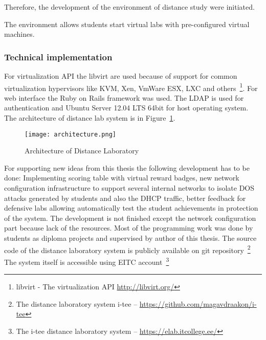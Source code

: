 Therefore, the development of the environment of distance study were initiated.

The environment allows students start virtual labs with pre-configured virtual machines. 
\subsubsection{Technical implementation}
For virtualization \gls{API} the libvirt are used because of support for common virtualization hypervisors like \gls{KVM}, Xen, VmWare ESX, LXC and others~\footnote{libvirt - The virtualization API \url{http://libvirt.org/}}. For web interface the Ruby on Rails framework was used. The \gls{LDAP} is used for authentication and Ubuntu Server 12.04 LTS 64bit for host operating system. The architecture of distance lab system is in Figure~\ref{fig:Architecture of Distance Laboratory}.

\begin{figure}[ht]
\centering
\texttt{[image: architecture.png]}
\caption{Architecture of Distance Laboratory}
\label{fig:Architecture of Distance Laboratory}
\end{figure}

For supporting new ideas from this thesis the following development has to be done: Implementing scoring table with virtual reward badges, new network configuration infrastructure to support several internal networks to isolate \gls{DOS} attacks generated by students and also the \gls{DHCP} traffic, better feedback for defensive labs allowing automatically test the student achievements in protection of the system.
The development is not finished except the network configuration part because lack of the resources. Most of the programming work was done by students as diploma projects and supervised by author of this thesis.
The source code of the distance laboratory system is publicly available on \gls{git} repository~\footnote{The distance laboratory system i-tee -- \url{https://github.com/magavdraakon/i-tee}}
The system itself is accessible using \gls{EITC} account~\footnote{The i-tee distance laboratory system -- \url{https://elab.itcollege.ee/}}
%


